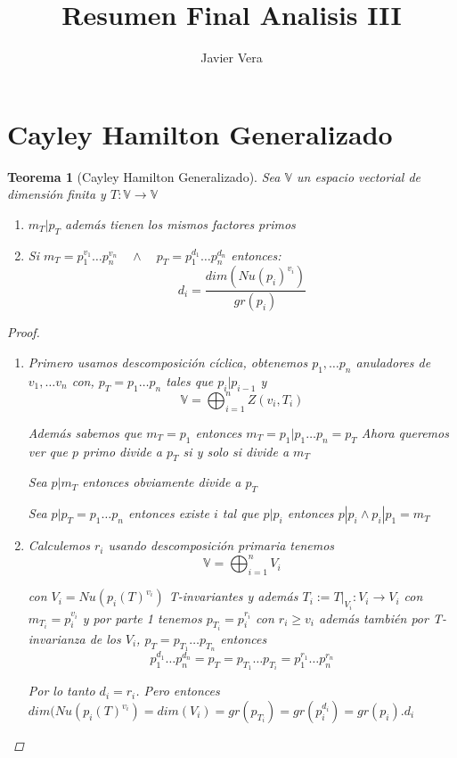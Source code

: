 \documentclass{article}
\theoremstyle{break}
\newtheorem{theorem}{Teorema}[section]
\begin{document}
    
\title{Resumen Final Analisis III}
\author{Javier Vera}
\maketitle
\newpage

\section{Cayley Hamilton Generalizado}
\begin{theorem}[Cayley Hamilton Generalizado]

  Sea $\mathbb{V}$ un espacio vectorial de dimensión finita y $T: \mathbb{V} \rightarrow \mathbb{V}$
  \begin{enumerate}
    \item $m_T | p_T$ además tienen los mismos factores primos
    \item Si $m_T = p_1^{v_1}\ldots p_n^{v_n}\quad \land\quad p_T = p_1^{d_1}\ldots p_n^{d_n}$ entonces:
      $$d_i = \frac{dim(Nu(p_i)^{v_i})}{gr(p_i)}$$
  \end{enumerate}
  \begin{proof}
    \begin{enumerate}
      \item Primero usamos descomposición cíclica, obtenemos $p_1,\ldots p_n$ anuladores de $v_1,\ldots v_n$ con, $p_T = p_1\ldots p_n$ tales que $p_i | p_{i-1}$ y  
        $$ \mathbb{V} = \bigoplus_{i = 1}^{n} Z(v_i , T_i) $$ 

        Además sabemos que $m_T = p_1$ entonces $m_T = p_1 | p_1\ldots p_n = p_T$ 
        Ahora queremos ver que $p$ primo divide a $p_T$ si y solo si divide a $m_T$

        Sea $p|m_T$ entonces obviamente divide a $p_T$

        Sea $p|p_T = p_1\ldots p_n$ entonces existe $i$ tal que $p|p_i$ entonces $p|p_i \land p_i|p_1=m_T$
      \item Calculemos $r_i$ usando descomposición primaria tenemos $$\mathbb{V} = \bigoplus_{i=1}^{n} V_i $$ 

        con $V_i = Nu (p_i(T)^{v_i})$ T-invariantes y además $T_i := T|_{V_i} : V_i \rightarrow V_i$ con $m_{T_i} = p_i^{v_i}$ 
        y por parte 1 tenemos $p_{T_i} = p_i^{r_i}$ con 
        $r_i \geq v_i$ además también por T-invarianza de los $V_i$, $p_T = p_{T_1}\ldots p_{T_n}$ entonces 
        $$p_1^{d_1}\ldots p_n^{d_n} = p_T = p_{T_1}\ldots p_{T_i} = p_1^{r_1}\ldots p_n^{r_n}$$

        Por lo tanto $d_i = r_i$. Pero entonces $ dim(Nu(p_i(T)^{v_i})= dim(V_i) = gr(p_{T_i}) = gr(p_i^{d_i}) = gr(p_i).d_i$
    \end{enumerate}
  \end{proof}
\end{theorem}
\end{document}
